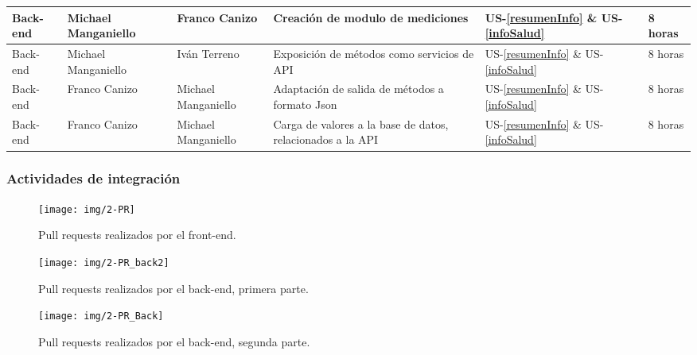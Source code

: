 {\begin{center}
{\begin{tabular}{|l|l|l|p{5cm}|l|p{1cm}|}
				Back-end & Michael Manganiello & Franco Canizo & Creación de modulo de mediciones&US-\ref{resumenInfo} \& US-\ref{infoSalud} & 8 horas \\ \hline
				Back-end & Michael Manganiello & Iván Terreno & Exposición de métodos como servicios de API 	& US-\ref{resumenInfo} \& US-\ref{infoSalud} & 8 horas \\ \hline
				Back-end & Franco Canizo & Michael Manganiello   & Adaptación de salida de métodos a formato Json&US-\ref{resumenInfo} \& US-\ref{infoSalud} & 8 horas \\ \hline
				Back-end & Franco Canizo & Michael Manganiello  & Carga de valores a la base de datos, relacionados a la API&US-\ref{resumenInfo} \& US-\ref{infoSalud} & 8 horas \\ \hline
			\end{tabular}
		}
	\end{center}
}

\subsubsection{Actividades de integración}

\begin{figure}[h]
  \centering
  \texttt{[image: img/2-PR]}
  \caption{Pull requests realizados por el front-end.}
  \label{2-PR}
\end{figure}
\begin{figure}[h]
  \centering
  \texttt{[image: img/2-PR\_back2]}
  \caption{Pull requests realizados por el back-end, primera parte.}
  \label{2-PR_back2}
\end{figure}
\begin{figure}[h]
  \centering
  \texttt{[image: img/2-PR\_Back]}
  \caption{Pull requests realizados por el back-end, segunda parte.}
  \label{2-PR_Back}
\end{figure}

\clearpage
    
	


\begin{comment}
\subsection{Fase de Análisis}

En esta fase comenzaremos definiendo el Sprint backlog y describiendo en detalle cada una de las tareas que la componen, además se realizará un diagrama de clases iniciales (\textbf{Figura \ref{modelo_datos}}) que nos permitirá guiarnos durante el avance del sprint de ese modo obtener un sistema consistente. 
\end{comment}



